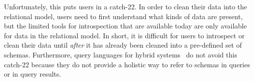Unfortunately, this puts users in a catch-22. In order to clean their data into the relational model, users need to first understand what kinds of data are present, but the limited tools for introspection that are available today are only available for data in the relational model. In short, it is difficult for users to introspect or clean their data until {\em after} it has already been cleaned into a pre-defined set of schemas. Furthermore, query languages for hybrid systems~\cite{asterixdb, sql++, snowflake, partiql}
do not avoid this catch-22 because they do not provide a holistic way to refer to schemas in queries or in query results.